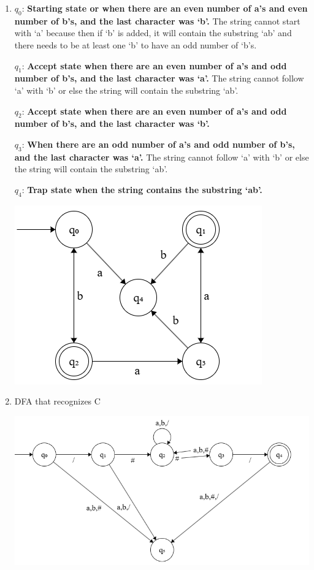 \documentclass{article}
\begin{document}
\begin{enumerate}[label=\Alph*.]
    \item
    $q_0$: \textbf{Starting state or when there are an even number of a's and even number of b's, and the last character was `b'.} The string cannot start with `a' because then if `b' is added, it will contain the substring `ab' and there needs to be at least one `b' to have an odd number of `b's.
    
    $q_1$: \textbf{Accept state when there are an even number of a's and odd number of b's, and the last character was `a'.} The string cannot follow `a' with `b' or else the string will contain the substring `ab'.

    $q_2$: \textbf{Accept state when there are an even number of a's and odd number of b's, and the last character was `b'.}

    $q_3$: \textbf{When there are an odd number of a's and odd number of b's, and the last character was `a'.} The string cannot follow `a' with `b' or else the string will contain the substring `ab'.

    $q_4$: \textbf{Trap state when the string contains the substring `ab'.}
    
    \begin{center}
        \includegraphics[scale=1]{dfa.png}
    \end{center}

    \item DFA that recognizes C
    
    \begin{center}
        \includegraphics[scale=0.65]{dfa2.png}
    \end{center}
\end{enumerate}
\end{document}

